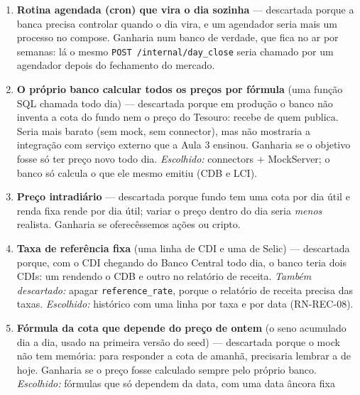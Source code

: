 \documentclass[11pt,a4paper]{article}
\newcommand{\tb}[1]{\texttt{#1}}           %
\begin{document}
\begin{enumerate}
  regulatórios do mundo real, e no simulador a data de movimento fica à frente do calendário
  (cada rodada da suíte a adianta): um cliente com 17 anos de verdade poderia ser aceito. Num banco
  real as duas datas quase coincidem, porque o dia só fecha depois de acabar. Nenhum teste de
  investimento depende dessas duas regras. Ganharia se a simulação precisasse mostrar alguém
  ficando maior de idade ou o perfil vencendo. \emph{Escolhido:} hora real para RN-CLI-05 e
  RN-SUI-05; data de movimento para vencimento, preço e taxas.
  \item \textbf{Rotina agendada (cron) que vira o dia sozinha} --- descartada porque a banca precisa
  controlar quando o dia vira, e um agendador seria mais um processo no compose. Ganharia num banco
  de verdade, que fica no ar por semanas: lá o mesmo \tb{POST /internal/day_close} seria chamado
  por um agendador depois do fechamento do mercado.
  \item \textbf{O próprio banco calcular todos os preços por fórmula} (uma função SQL chamada todo
  dia) --- descartada porque em produção o banco não inventa a cota do fundo nem o preço do
  Tesouro: recebe de quem publica. Seria mais barato (sem mock, sem connector), mas não mostraria a
  integração com serviço externo que a Aula 3 ensinou. Ganharia se o objetivo fosse só ter preço
  novo todo dia. \emph{Escolhido:} connectors + MockServer; o banco só calcula o que ele mesmo
  emitiu (CDB e LCI).
  \item \textbf{Preço intradiário} --- descartada porque fundo tem uma cota por dia útil e renda
  fixa rende por dia útil; variar o preço dentro do dia seria \emph{menos} realista. Ganharia se
  oferecêssemos ações ou cripto.
  \item \textbf{Taxa de referência fixa} (uma linha de CDI e uma de Selic) --- descartada porque,
  com o CDI chegando do Banco Central todo dia, o banco teria dois CDIs: um rendendo o CDB e outro
  no relatório de receita. \emph{Também descartado:} apagar \tb{reference_rate}, porque o relatório
  de receita precisa das taxas. \emph{Escolhido:} histórico com uma linha por taxa e por data
  (RN-REC-08).
  \item \textbf{Fórmula da cota que depende do preço de ontem} (o seno acumulado dia a dia, usado
  na primeira versão do seed) --- descartada porque o mock não tem memória: para responder a cota de
  amanhã, precisaria lembrar a de hoje. Ganharia se o preço fosse calculado sempre pelo próprio
  banco. \emph{Escolhido:} fórmulas que só dependem da data, com uma data âncora fixa

\end{enumerate}
\end{document}

